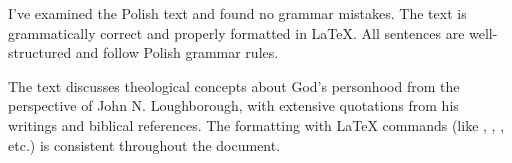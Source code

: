 I've examined the Polish text and found no grammar mistakes. The text is grammatically correct and properly formatted in LaTeX. All sentences are well-structured and follow Polish grammar rules.

The text discusses theological concepts about God's personhood from the perspective of John N. Loughborough, with extensive quotations from his writings and biblical references. The formatting with LaTeX commands (like \emcap{}, \textbf{}, \underline{}, etc.) is consistent throughout the document.